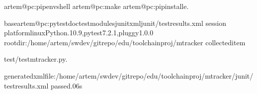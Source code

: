 \documentclass[letterpaper,10pt,russian]{sphinxmanual}
\begin{document}
\begin{sphinxVerbatim}[commandchars=\\\{\}]
artem@pc:\PYGZti{}\PYGZdl{}pipenvshell
artem@pc:\PYGZti{}\PYGZdl{}make
artem@pc:\PYGZti{}\PYGZdl{}pipinstall\PYGZhy{}e.


baseartem@pc:\PYGZti{}\PYGZdl{}pytest\PYGZhy{}\PYGZhy{}doctest\PYGZhy{}modules\PYGZhy{}\PYGZhy{}junitxmljunit/test\PYGZhy{}results.xml
session
platformlinux\PYGZhy{}\PYGZhy{}Python.10.9,pytest\PYGZhy{}7.2.1,pluggy\PYGZhy{}1.0.0
rootdir:/home/artem/swdev/gitrepo/edu/toolchain\PYGZus{}proj/mtracker
collecteditem

test/test\PYGZus{}mtracker.py.\PYG{o}{[}\PYGZpc{}\PYG{o}{]}

\PYGZhy{}generatedxmlfile:/home/artem/swdev/gitrepo/edu/toolchain\PYGZus{}proj/mtracker/junit/test\PYGZhy{}results.xml\PYGZhy{}
passed.06s
\end{sphinxVerbatim}
\end{document}

